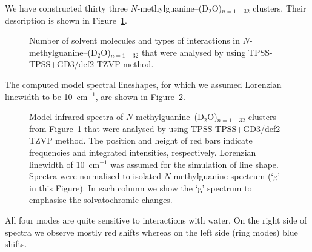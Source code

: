 \documentclass[b5paper,oneside,fleqn,11pt]{book}
\begin{document}
\begin{refsection}
We have constructed thirty three $N$-methylguanine--(D$_2$O)$_{n=1-32}$ clusters.
Their description is shown in Figure~\ref{f:guanine-clusters-description}.
%
\begin{figure}[t!]
\centering
\setlength\fboxsep{0.4pt}
\setlength\fboxrule{0.5pt}
\caption{
Number of solvent molecules and 
types of interactions in $N$-methylguanine--(D$_2$O)$_{n=1-32}$ that were analysed
by using TPSS-TPSS+GD3/def2-TZVP method.
\label{f:guanine-clusters-description}}
\end{figure}
%
The computed model spectral lineshapes, for which we assumed Lorenzian linewidth to be 10~cm$^{-1}$,
are shown in Figure~\ref{f:guanine-clusters-spectra}.
%
\begin{figure}[t!]
\centering
\setlength\fboxsep{0.4pt}
\setlength\fboxrule{0.5pt}
\caption{
Model infrared spectra
of $N$-methylguanine--(D$_2$O)$_{n=1-32}$ clusters from 
Figure~\ref{f:guanine-clusters-description} that were analysed
by using TPSS-TPSS+GD3/def2-TZVP method. The position and height of red bars
indicate frequencies and integrated intensities, respectively. Lorenzian linewidth of 10~cm$^{-1}$
was assumed for the simulation of line shape. Spectra were normalised to
isolated $N$-methylguanine spectrum (`g' in this Figure). In each column we show
the `g' spectrum to emphasise the solvatochromic changes.
\label{f:guanine-clusters-spectra}}
\end{figure}
%
All four modes are quite sensitive to interactions with water. On the right side
of spectra we observe mostly red shifts whereas on the left side (ring modes)
blue shifts.


\end{refsection}
\end{document}
